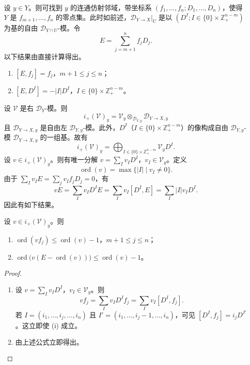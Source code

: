 设 $y\in Y$。则可找到 $y$ 的连通仿射邻域，带坐标系 $(f_1,\dots,f_n;D_1,\dots,D_n)$，使得 $Y$ 是 $f_{m+1},\dots,f_n$ 的零点集。此时如前述，$\mathcal{D}_{Y\to X}|_U$ 是以 $(D^I;I\in\{0\}\times\mathbb{Z}_+^{n-m})$ 为基的自由 $\mathcal{D}_{Y\cap U}$-模。令
$$E=\sum_{j=m+1}^nf_jD_j.$$
以下结果由直接计算得出。

\begin{lemma}\label{lem:4.8.4}
\begin{enumerate}[label=(\roman*)]
  \item $[E,f_j]=f_j$，$m+1\le j\le n$；
  \item $[E,D^I]=-|I|D^I$，$I\in\{0\}\times\mathbb{Z}_+^{n-m}$。
\end{enumerate}
\end{lemma}

设 $\mathcal{V}$ 是右 $\mathcal{D}_Y$-模。则
$$i_+(\mathcal{V})_y=\mathcal{V}_y\otimes_{\mathcal{D}_{Y,y}}\mathcal{D}_{Y\to X,y}$$
且 $\mathcal{D}_{Y\to X,y}$ 是自由左 $\mathcal{D}_{Y,y}$-模。此外，$D^I$（$I\in\{0\}\times\mathbb{Z}_+^{n-m}$）的像构成自由 $\mathcal{D}_{Y,y}$-模 $\mathcal{D}_{Y\to X,y}$ 的一组基。故有
$$i_+(\mathcal{V})_y=\bigoplus_{I\in\{0\}\times\mathbb{Z}_+^{n-m}}\mathcal{V}_yD^I.$$
设 $v\in i_+(\mathcal{V})_y$。则有唯一分解 $v=\sum_Iv_ID^I$，$v_I\in\mathcal{V}_y$。定义
$$\operatorname{ord}(v)=\max\{|I|\mid v_I\ne0\}.$$
由于 $\sum_Iv_IE=\sum_jv_If_jD_j=0$，有
$$vE=\sum_Iv_ID^IE=\sum_Iv_I[D^I,E]=\sum_I|I|v_ID^I.$$
因此有如下结果。

\begin{lemma}\label{lem:4.8.5}
设 $v\in i_+(\mathcal{V})_y$。则
\begin{enumerate}[label=(\roman*)]
  \item $\operatorname{ord}(vf_j)\le\operatorname{ord}(v)-1$，$m+1\le j\le n$；
  \item $\operatorname{ord}\bigl(v(E-\operatorname{ord}(v))\bigr)\le\operatorname{ord}(v)-1$。
\end{enumerate}
\end{lemma}

\begin{proof}
\begin{enumerate}[label=(\roman*)]
  \item 设 $v=\sum_Iv_ID^I$，$v_I\in\mathcal{V}_y$。则
    $$vf_j=\sum_Iv_ID^If_j=\sum_Iv_I[D^I,f_j].$$
    若 $I=(i_1,\dots,i_j,\dots,i_n)$ 且 $I'=(i_1,\dots,i_j-1,\dots,i_n)$，可见
    $[D^I,f_j]=i_jD^{I'}$。这立即使 (i) 成立。
  \item 由上述公式立即得出。
\end{enumerate}
\end{proof}

